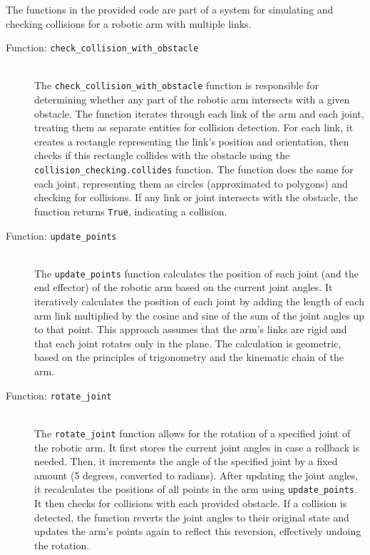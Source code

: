 \documentclass{article}
\begin{document}
The functions in the provided code are part of a system for simulating and checking collisions for a robotic arm with multiple links.

\begin{description}
  \item[Function: \texttt{check\_collision\_with\_obstacle}] \hfill \\
  The \texttt{check\_collision\_with\_obstacle} function is responsible for determining whether any part of the robotic arm intersects with a given obstacle. The function iterates through each link of the arm and each joint, treating them as separate entities for collision detection. For each link, it creates a rectangle representing the link's position and orientation, then checks if this rectangle collides with the obstacle using the \texttt{collision\_checking.collides} function. The function does the same for each joint, representing them as circles (approximated to polygons) and checking for collisions. If any link or joint intersects with the obstacle, the function returns \texttt{True}, indicating a collision.

  \item[Function: \texttt{update\_points}] \hfill \\
  The \texttt{update\_points} function calculates the position of each joint (and the end effector) of the robotic arm based on the current joint angles. It iteratively calculates the position of each joint by adding the length of each arm link multiplied by the cosine and sine of the sum of the joint angles up to that point. This approach assumes that the arm's links are rigid and that each joint rotates only in the plane. The calculation is geometric, based on the principles of trigonometry and the kinematic chain of the arm.

  \item[Function: \texttt{rotate\_joint}] \hfill \\
  The \texttt{rotate\_joint} function allows for the rotation of a specified joint of the robotic arm. It first stores the current joint angles in case a rollback is needed. Then, it increments the angle of the specified joint by a fixed amount (5 degrees, converted to radians). After updating the joint angles, it recalculates the positions of all points in the arm using \texttt{update\_points}. It then checks for collisions with each provided obstacle. If a collision is detected, the function reverts the joint angles to their original state and updates the arm's points again to reflect this reversion, effectively undoing the rotation.


\end{description}
\end{document}
